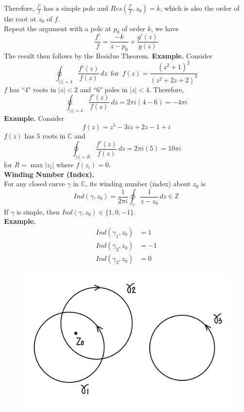 \documentclass[11pt]{article}
\begin{document}
Therefore, $\frac{f'}{f}$ has a simple pole and $Res(\frac{f'}{f}, z_0) = k$, which is also the order of the root at $z_0$ of $f$. \\
Repeat the argument with a pole at $p_0$ of order $k$, we have 
$$ \frac{f'}{f} = \frac{-k}{z - p_0} + \frac{g'(z)}{g(z)} $$
The result then follows by the Residue Theorem. 
\newpage
\textbf{Example.} Consider
$$\oint_{|z| = 4} \frac{f'(z)}{f(z)} \, dz \, \text{ for } \, f(z) = \frac{(z^2 + 1)^2}{(z^2 + 2z + 2)^3} $$
$f$ has ``4" roots in $|z| < 2$ and ``6" poles in $|z| < 4$. Therefore, 
$$\oint_{|z| = 4}\frac{f'(z)}{f(z)}\,dz = 2\pi i(4 - 6) = -4\pi i$$
\newline
\textbf{Example.} Consider 
$$ f(z) = z^5 - 3i z + 2z - 1 + i$$
$f(z)$ has 5 roots in $\mathbb{C}$ and 
$$ \oint_{|z| = R}\frac{f'(z)}{f(z)} \, dz = 2\pi i(5) = 10\pi i$$ 
for $R = \max|z_i|$ where $f(z_i) = 0$. \\
\newline
\textbf{Winding Number (Index).} \\
For any closed curve $\gamma$ in $\mathbb{C}$, its winding number (index) about $z_0$ is 
$$ Ind(\gamma, z_0) = \frac{1}{2\pi i}\oint_\gamma \frac{1}{z - z_0} \, dz \in \mathbb{Z}$$
If $\gamma$ is simple, then $Ind(\gamma, z_0) \in \{1, 0, -1\}$. \\
\newline
\textbf{Example.} 
\begin{align*}
	Ind(\gamma_1, z_0) &= 1 \\
	Ind(\gamma_2, z_0) &= -1 \\
	Ind(\gamma_3, z_0) &= 0 \\
\end{align*}
\begin{figure}[H]
\includegraphics[scale=0.2]{22_4}
\centering
\end{figure} 
\end{document}

